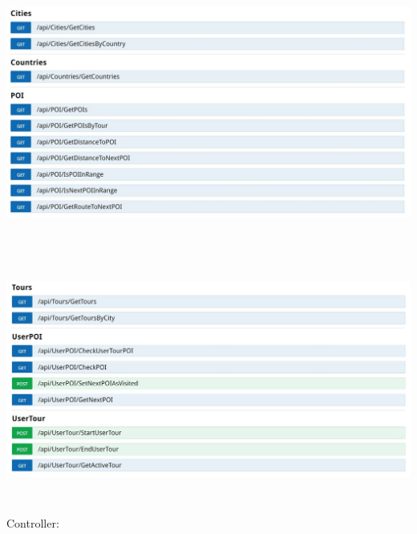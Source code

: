 \documentclass[a4paper,10pt,xetex]{article}
\begin{document}
\bigskip

\includegraphics[width=6.5in,height=3.4165in]{swagger1.jpg} 

\includegraphics[width=6.4862in,height=3.139in]{swagger2.jpg} 


\bigskip

	Controller:

\tabulinesep=1.2mm
\end{document}
